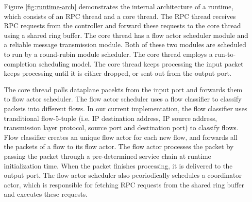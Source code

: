 
Figure \ref{fig:runtime-arch} demonstrates the internal architecture of a runtime, which consists of an RPC thread and a core thread. The RPC thread receives RPC requests from the controller and forward these requests to the core thread using a shared ring buffer. The core thread has a flow actor scheduler module and a reliable message transmission module. Both of these two modules are scheduled to run by a round-rubin module scheduler. The core thread employs a run-to-completion scheduling model. The core thread keeps processing the input packet keeps processing until it is either dropped, or sent out from the output port.


The core thread polls dataplane pacekts from the input port and forwards them to flow actor scheduler. The flow actor scheduler uses a flow classifier to classify packets into different flows. In our current implementation, the flow classifier uses tranditional flow-5-tuple (i.e. IP destination address, IP source address, transmission layer protocol, source port and destination port) to classify flows. Flow classifier creates an unique flow actor for each new flow, and forwards all the packets of a flow to its flow actor. The flow actor processes the packet by passing the packet through a pre-determined service chain at runtime initialization time. When the packet finishes processing, it is delivered to the output port. The flow actor scheduler also peoriodically schedules a coordinator actor, which is responsible for fetching RPC requests from the shared ring buffer and executes these requests.

